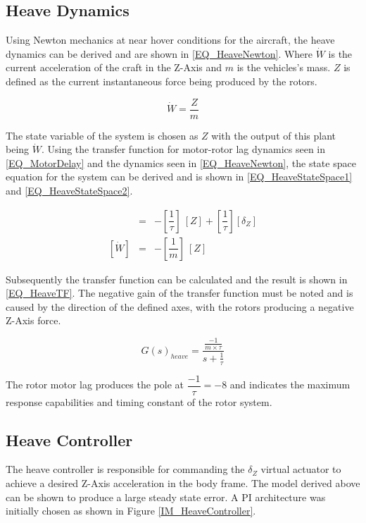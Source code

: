 	 \subsection{Heave Dynamics}
	 Using Newton mechanics at near hover conditions for the aircraft, the heave dynamics can be derived and are shown in \eqref{EQ_HeaveNewton}. Where $\dot{W}$ is the current acceleration of the craft in the Z-Axis and $m$ is the vehicles's mass. $Z$ is defined as the current instantaneous force being produced by the rotors.
	 
	 \begin{equation}
	 \label{EQ_HeaveNewton}
	 \dot{W} = \dfrac{Z}{m}
	 \end{equation}
	 
	 The state variable of the system is chosen as $Z$ with the output of this plant being $\dot{W}$. Using the transfer function for motor-rotor lag dynamics seen in \eqref{EQ_MotorDelay} and the dynamics seen in \eqref{EQ_HeaveNewton}, the state space equation for the system can be derived and is shown in \eqref{EQ_HeaveStateSpace1} and \eqref{EQ_HeaveStateSpace2}. 
	 
	 \begin{eqnarray}
	 [\dot{Z}] &=& - [\dfrac{1}{\tau}] \ [Z] + [\dfrac{1}{\tau}] [\delta_Z]\label{EQ_HeaveStateSpace1}\\\label{EQ_HeaveStateSpace11}
	 [\dot{W}] &=& - [\dfrac{1}{m}] \ [Z]\label{EQ_HeaveStateSpace2}
	 \end{eqnarray}
	 
	 Subsequently the transfer function can be calculated and the result is shown in \eqref{EQ_HeaveTF}. The negative gain of the transfer function must be noted and is caused by the direction of the defined axes, with the rotors producing a negative Z-Axis force.
	 
	 \begin{equation}
	 G(s)_{heave} = \frac{\frac{-1}{m \times \tau}}{s + \frac{1}{\tau}}\label{EQ_HeaveTF}
	 \end{equation}
	 
	 The rotor motor lag produces the pole at $\dfrac{-1}{\tau} = -8$ and indicates the maximum response capabilities and timing constant of the rotor system.
	 
	 \subsection{Heave Controller}
	 The heave controller is responsible for commanding the $\delta_Z$ virtual actuator to achieve a desired Z-Axis acceleration in the body frame. The model derived above can be shown to produce a large steady state error. A PI architecture was initially chosen as shown in Figure \ref{IM_HeaveController}. 
	 
